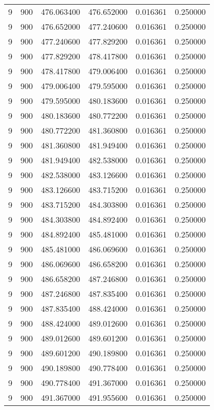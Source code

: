 \begin{longtable}{rrrrrr}
9 & 900 & 476.063400 & 476.652000 & 0.016361 & 0.250000 \\
9 & 900 & 476.652000 & 477.240600 & 0.016361 & 0.250000 \\
9 & 900 & 477.240600 & 477.829200 & 0.016361 & 0.250000 \\
9 & 900 & 477.829200 & 478.417800 & 0.016361 & 0.250000 \\
9 & 900 & 478.417800 & 479.006400 & 0.016361 & 0.250000 \\
9 & 900 & 479.006400 & 479.595000 & 0.016361 & 0.250000 \\
9 & 900 & 479.595000 & 480.183600 & 0.016361 & 0.250000 \\
9 & 900 & 480.183600 & 480.772200 & 0.016361 & 0.250000 \\
9 & 900 & 480.772200 & 481.360800 & 0.016361 & 0.250000 \\
9 & 900 & 481.360800 & 481.949400 & 0.016361 & 0.250000 \\
9 & 900 & 481.949400 & 482.538000 & 0.016361 & 0.250000 \\
9 & 900 & 482.538000 & 483.126600 & 0.016361 & 0.250000 \\
9 & 900 & 483.126600 & 483.715200 & 0.016361 & 0.250000 \\
9 & 900 & 483.715200 & 484.303800 & 0.016361 & 0.250000 \\
9 & 900 & 484.303800 & 484.892400 & 0.016361 & 0.250000 \\
9 & 900 & 484.892400 & 485.481000 & 0.016361 & 0.250000 \\
9 & 900 & 485.481000 & 486.069600 & 0.016361 & 0.250000 \\
9 & 900 & 486.069600 & 486.658200 & 0.016361 & 0.250000 \\
9 & 900 & 486.658200 & 487.246800 & 0.016361 & 0.250000 \\
9 & 900 & 487.246800 & 487.835400 & 0.016361 & 0.250000 \\
9 & 900 & 487.835400 & 488.424000 & 0.016361 & 0.250000 \\
9 & 900 & 488.424000 & 489.012600 & 0.016361 & 0.250000 \\
9 & 900 & 489.012600 & 489.601200 & 0.016361 & 0.250000 \\
9 & 900 & 489.601200 & 490.189800 & 0.016361 & 0.250000 \\
9 & 900 & 490.189800 & 490.778400 & 0.016361 & 0.250000 \\
9 & 900 & 490.778400 & 491.367000 & 0.016361 & 0.250000 \\
9 & 900 & 491.367000 & 491.955600 & 0.016361 & 0.250000 \\

\end{longtable}

